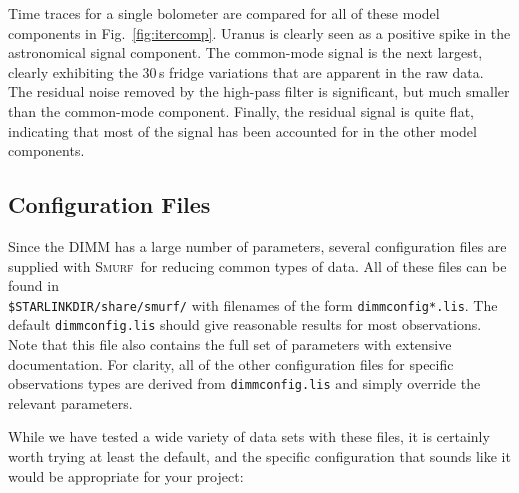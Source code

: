 \documentclass[twoside,11pt]{article}
\newcommand{\xref}[3]{#1}
\newcommand{\xlabel}[1]{}
\renewcommand{\_}{\texttt{\symbol{95}}}
\newcommand{\smurf}{\xref{\textsc{Smurf}}{sun258}{}}
\begin{document}
Time traces for a single bolometer are compared for all of these model
components in Fig.~\ref{fig:itercomp}. Uranus is clearly seen as a
positive spike in the astronomical signal component. The common-mode
signal is the next largest, clearly exhibiting the 30\,s fridge
variations that are apparent in the raw data. The residual noise
removed by the high-pass filter is significant, but much smaller than
the common-mode component. Finally, the residual signal is quite flat,
indicating that most of the signal has been accounted for in the other
model components.

\subsection{\xlabel{config}Configuration Files}
\label{sec:config}

Since the DIMM has a large number of parameters, several configuration
files are supplied with \smurf\ for reducing common types of data. All
of these files can be found in
\\ \texttt{\$STARLINK\_DIR/share/smurf/} with filenames of the form
\texttt{dimmconfig*.lis}. The default \texttt{dimmconfig.lis} should
give reasonable results for most observations. Note that this file
also contains the full set of parameters with extensive
documentation. For clarity, all of the other configuration files for
specific observations types are derived from \texttt{dimmconfig.lis}
and simply override the relevant parameters.

While we have tested a wide variety of data sets with these files, it
is certainly worth trying at least the default, and the specific
configuration that sounds like it would be appropriate for your
project:
\end{document}
